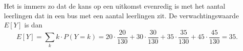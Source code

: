 \begin{enumerate}[label=(\alph*)]
{            Het is immers zo dat de kans op een uitkomst evenredig is met het aantal leerlingen dat in een bus met een aantal leerlingen zit.
            De verwachtingswaarde $E[Y]$ is dan
            \[
               E[Y] = \sum_k k \cdot P(Y=k) = 20 \cdot \frac{20}{130} + 30 \cdot \frac{30}{130}  + 35 \cdot \frac{35}{130} + 45 \cdot \frac{45}{130} = 35.
            \]
        }
\end{enumerate}